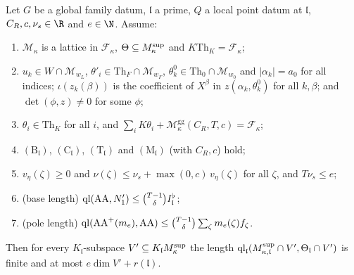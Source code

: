 \begin{theorem}\label{pf:onto1:localBound}
Let $G$ be a global family datum, $\mathfrak l$ a prime, $Q$ a local point datum at $\mathfrak l$, $C_R,c,\nu_s\in\R$ and
$e\in\N$. Assume:
\begin{enumerate}[label=(\alph*)]
\item $\mathcal M_\kappa$ is a lattice in $\mathcal F_\kappa$, $\Theta\subseteq M^{\mathrm{sup}}_\kappa$ and $K\mathrm{Th}_K=\mathcal F_\kappa$;
\item $u_k\in W\cap\mathcal M_{w_L}$, $\theta'_i\in\mathrm{Th}_F\cap\mathcal M_{w_F}$, $\theta^0_k\in\mathrm{Th}_0\cap\mathcal M_{w_0}$ and
$|\alpha_k|=a_0$ for all indices; $\iota(z_k(\beta))$ is the coefficient of $X^\beta$ in $z(\alpha_k,\theta^0_k)$ for all
$k,\beta$; and $\det(\phi,z)\ne0$ for some $\phi$;
\item $\theta_i\in\mathrm{Th}_K$ for all $i$, and $\sum_iK\theta_i+\mathcal M^{\mathrm{gg}}_\kappa(C_R,T,c)=\mathcal F_\kappa$;
\item $(\mathrm B_{\mathfrak l})$, $(\mathrm C_{\mathfrak l})$, $(\mathrm T_{\mathfrak l})$ and $(\mathrm M_{\mathfrak l})$ (with $C_R,c$) hold;
\item $v_\eta(\zeta)\ge0$ and $\nu(\zeta)\le\nu_s+\max(0,c)\,v_\eta(\zeta)$ for all $\zeta$, and $T\nu_s\le e$;
\item (base length) $\operatorname{ql}(\mathrm{AA},N_1')\le\binom{T-1}{\delta} I_{\mathfrak l}^\flat$;
\item (pole length) $\operatorname{ql}(\mathrm{AA}^+(m_e),\mathrm{AA})\le\binom{T-1}{\delta}\sum_\zeta m_e(\zeta)f_\zeta$.
\end{enumerate}
Then for every $K_{\mathfrak l}$-subspace $V'\subseteq K_{\mathfrak l}M^{\mathrm{sup}}_\kappa$ the length
$\operatorname{ql}_{\mathfrak l}(M^{\mathrm{sup}}_{\kappa,\mathfrak l}\cap V',\Theta_{\mathfrak l}\cap V')$ is finite and at most
$e\dim V'+r(\mathfrak l)$.
\end{theorem}

